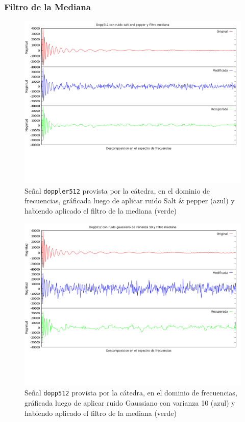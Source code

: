 \subsubsection{Filtro de la Mediana}

\begin{figure}[H]
\begin {center}
\includegraphics[width=500pt]{imagenes/dopp512-imp-median.png}
\end {center}
\caption{Se\~nal \texttt{doppler512} provista por la c\'atedra, en el dominio de frecuencias, gr\'aficada
luego de aplicar ruido Salt \& pepper (azul) y habiendo aplicado el filtro de la mediana (verde)}
\label{fig:medImp}
\end{figure}

\begin{figure}[H]
\begin {center}
\includegraphics[width=500pt]{imagenes/dopp512-gauss-50-median.png}
\end {center}
\caption{Se\~nal \texttt{dopp512} provista por la c\'atedra, en el dominio de frecuencias, gr\'aficada
luego de aplicar ruido Gaussiano con varianza 10 (azul) y habiendo aplicado el filtro de la mediana (verde)}
\label{fig:medGauss}
\end{figure}


